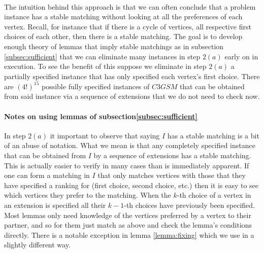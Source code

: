 \begin{definition}
\paragraph{}
The intuition behind this approach is that we can often conclude that a problem instance has a stable matching without looking at all the preferences of each vertex. Recall, for instance that if there is a cycle of vertices, all respective first choices of each other, then there is a stable matching. The goal is to develop enough theory of lemmas that imply stable matchings as in subsection \ref{subsec:sufficient} that we can eliminate many instances in step $2(a)$ early on in execution. To see the benefit of this suppose we eliminate in step $2(a)$ a partially specified instance that has only specified each vertex's first choice. There are $(4!)^{15}$ possible fully specified instances of $C3GSM$ that can be obtained from said instance via a sequence of extensions that we do not need to check now.
\paragraph{Notes on using lemmas of subsection\ref{subsec:sufficient}}
In step $2(a)$ it important to observe that saying $I$ has a stable matching is a bit of an abuse of notation. What we mean is that any completely specified instance that can be obtained from $I$ by a sequence of extensions has a stable matching. This is actually easier to verify in many cases than is immediately apparent. If one can form a matching in $I$ that only matches vertices with those that they have specified a ranking for (first choice, second choice, etc.) then it is easy to see which vertices they prefer to the matching. When the $k$-th choice of a vertex in an extension is specified all their $k-1$-th choices have previously been specified. Most lemmas only need knowledge of the vertices preferred by a vertex to their partner, and so for them just match as above and check the lemma's conditions directly. There is a notable exception in lemma \ref{lemma:fixing} which we use in a slightly different way.

\end{definition}
